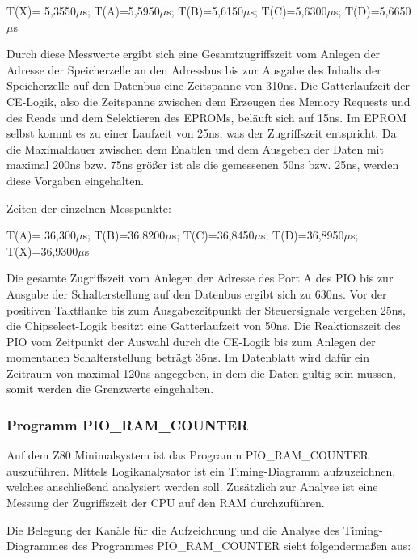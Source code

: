 T(X)= 5,3550$\mu$s; T(A)=5,5950$\mu$s; T(B)=5,6150$\mu$s; T(C)=5,6300$\mu$s; T(D)=5,6650$\mu$s

Durch diese Messwerte ergibt sich eine Gesamtzugriffszeit vom Anlegen der Adresse der Speicherzelle an den Adressbus bis zur Ausgabe des Inhalts der Speicherzelle auf den Datenbus eine Zeitspanne von 310ns.   Die Gatterlaufzeit der CE-Logik, also die Zeitspanne zwischen dem Erzeugen des Memory Requests und des Reads und dem Selektieren des EPROMs, beläuft sich auf 15ns. Im EPROM selbst kommt es zu einer Laufzeit von 25ns, was der Zugriffszeit entspricht. Da die Maximaldauer zwischen dem Enablen und dem Ausgeben der Daten mit maximal 200ns bzw. 75ns größer ist als die gemessenen 50ns bzw. 25ns, werden diese Vorgaben eingehalten.

Zeiten der einzelnen Messpunkte:

T(A)= 36,300$\mu$s;  T(B)=36,8200$\mu$s; T(C)=36,8450$\mu$s; T(D)=36,8950$\mu$s; T(X)=36,9300$\mu$s

Die gesamte Zugriffszeit vom Anlegen der Adresse des Port A des PIO bis zur Ausgabe der Schalterstellung auf den Datenbus ergibt sich zu 630ns. Vor der positiven Taktflanke bis zum Ausgabezeitpunkt der Steuersignale vergehen 25ns, die Chipselect-Logik besitzt eine Gatterlaufzeit von 50ns. Die Reaktionszeit des PIO vom Zeitpunkt der Auswahl durch die CE-Logik bis zum Anlegen der momentanen Schalterstellung beträgt 35ns. Im Datenblatt wird dafür ein Zeitraum von maximal 120ns angegeben, in dem die Daten gültig sein müssen, somit werden die Grenzwerte eingehalten.

\subsubsection{Programm PIO\_RAM\_COUNTER}
Auf dem Z80 Minimalsystem ist das Programm PIO\_RAM\_COUNTER auszuführen. Mittels Logikanalysator ist ein Timing-Diagramm aufzuzeichnen, welches anschließend analysiert werden soll. Zusätzlich zur Analyse ist eine Messung der Zugriffszeit der CPU auf den RAM durchzuführen.

Die Belegung der Kanäle für die Aufzeichnung und die Analyse des Timing-Diagrammes des Programmes PIO\_RAM\_COUNTER sieht folgendermaßen aus:

